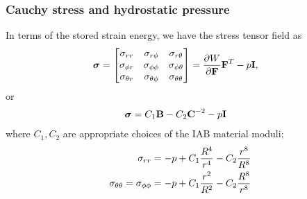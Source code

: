 \begin{frame}
	\frametitle{Cauchy stress and hydrostatic pressure}
	In terms of the stored strain energy, we have the stress tensor field as
	\begin{align}
	\bm{\sigma} &= \begin{bmatrix}
	\sigma_{rr} &  \sigma_{r\phi} &  \sigma_{r\theta}  \\
	\sigma_{\phi r} &   \sigma_{\phi \phi}  &   \sigma_{\phi \theta}  \\
	\sigma_{\theta r} &     \sigma_{\theta \phi} &     \sigma_{\theta \theta}
	\end{bmatrix} = \dfrac{\partial W}{\partial \textbf{F}} \textbf{F}^T - p\textbf{I}, 
	\label{eq:cauchy_stress}
	\end{align}
	or
		\begin{align}
		\bm{\sigma} &= C_1 \textbf{B} - C_2 \textbf{C}^{-2} - p \textbf{I}
		\label{eq:stress_constitutive}
		\end{align}
	where $C_1, C_2$ are appropriate choices of the IAB material moduli; %
	\begin{subequations}
		\begin{align}
		\sigma_{rr} &= -p + C_1 \dfrac{R^4}{r^4} - C_2 \dfrac{r^8}{R^8} \\
		\sigma_{\theta \theta} = \sigma_{\phi \phi} &= -p + C_1 \dfrac{r^2}{R^2} - C_2 \dfrac{R^8}{r^8} 
		\end{align}
		\label{eq:stress_compos}
	\end{subequations}
\end{frame}

